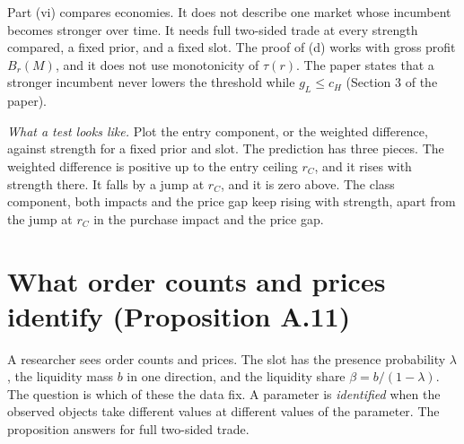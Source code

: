 \begin{watchout}
Part (vi) compares economies. It does not describe one market whose incumbent becomes stronger over time. It needs full two-sided trade at every strength compared, a fixed prior, and a fixed slot. The proof of (d) works with gross profit \(B_r(M)\), and it does not use monotonicity of \(\tau(r)\). The paper states that a stronger incumbent never lowers the threshold while \(g_L\le c_H\) (Section 3 of the paper).
\end{watchout}

\emph{What a test looks like.} Plot the entry component, or the weighted difference, against strength for a fixed prior and slot. The prediction has three pieces. The weighted difference is positive up to the entry ceiling \(r_C\), and it rises with strength there. It falls by a jump at \(r_C\), and it is zero above. The class component, both impacts and the price gap keep rising with strength, apart from the jump at \(r_C\) in the purchase impact and the price gap.

\section{What order counts and prices identify (Proposition A.11)}\label{sec:empirical-identify}

A researcher sees order counts and prices. The slot has the presence probability \(\lambda\), the liquidity mass \(b\) in one direction, and the liquidity share \(\beta=b/(1-\lambda)\). The question is which of these the data fix. A parameter is \emph{identified} when the observed objects take different values at different values of the parameter. The proposition answers for full two-sided trade.

